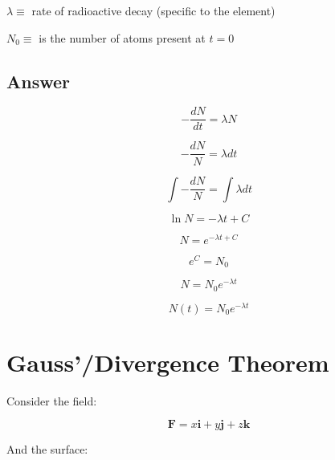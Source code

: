 \documentclass{article}
\begin{document}
$\lambda \equiv$ rate of radioactive decay (specific to the element)

$N_{0} \equiv$ is the number of atoms present at $t=0$

\subsection{Answer}

\begin{equation}
  - \frac{dN}{dt} = \lambda N
\end{equation}


\begin{equation}
  - \frac{dN}{N} = \lambda dt
\end{equation}

\begin{equation}
  \int - \frac{dN}{N} = \int \lambda dt
\end{equation}

\begin{equation}
  \ln{N} = - \lambda t + C
\end{equation}

\begin{equation}
  N = e^{- \lambda t + C}
\end{equation}

\begin{equation}
  e^{C} = N_0
\end{equation}

\begin{equation}
  N = N_0 e^{- \lambda t }
\end{equation}



\begin{equation}
  N(t) = N_0 e^{-\lambda t}
\end{equation}



\clearpage
\section{Gauss'/Divergence Theorem}
Consider the field:

\begin{equation}
  \mathbf{F} = x \mathbf{i} + 
  y  \mathbf{j} +
  z  \mathbf{k}
\end{equation}

And the surface:
\end{document}
